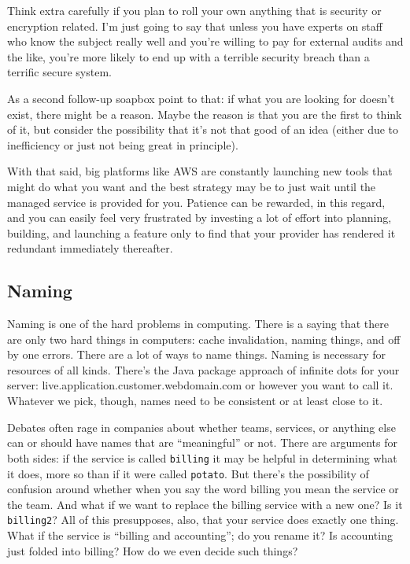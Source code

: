 Think extra carefully if you plan to roll your own anything that is security or encryption related. I'm just going to say that unless you have experts on staff who know the subject really well and you're willing to pay for external audits and the like, you're more likely to end up with a terrible security breach than a terrific secure system. 

As a second follow-up soapbox point to that: if what you are looking for doesn't exist, there might be a reason. Maybe the reason is that you are the first to think of it, but consider the possibility that it's not that good of an idea (either due to inefficiency or just not being great in principle). 

With that said, big platforms like AWS are constantly launching new tools that might do what you want and the best strategy may be to just wait until the managed service is provided for you. Patience can be rewarded, in this regard, and you can easily feel very frustrated by investing a lot of effort into planning, building, and launching a feature only to find that your provider has rendered it redundant immediately thereafter.

\subsection*{Naming}
Naming is one of the hard problems in computing. There is a saying that there are only two hard things in computers: cache invalidation, naming things, and off by one errors. There are a
lot of ways to name things. Naming is necessary for resources of all kinds. There's the Java package approach of infinite dots for your server: live.application.customer.webdomain.com or however you want to call it. Whatever we pick, though, names need to be consistent or at least close to it.

Debates often rage in companies about whether teams, services, or anything else can or should have names that are ``meaningful'' or not. There are arguments for both sides: if the service is called \texttt{billing} it may be helpful in determining what it does, more so than if it were called \texttt{potato}. But there's the possibility of confusion around whether when you say the word billing you mean the service or the team. And what if we want to replace the billing service with a new one? Is it \texttt{billing2}? All of this presupposes, also, that your service does exactly one thing. What if the service is ``billing and accounting''; do you rename it? Is accounting just folded into billing? How do we even decide such things? 

